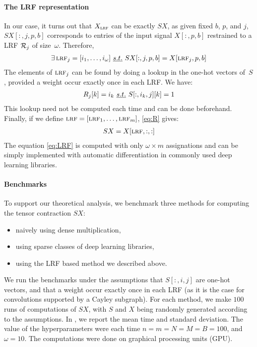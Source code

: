\paragraph{The LRF representation}
In our case, it turns out that $X_{\operatorname{\textsc{lrf}}}$ can be exactly $SX$, as given fixed $b$, $p$, and $j$, $SX[:,j,p,b]$ corresponds to entries of the input signal $X[:,p,b]$ restrained to a LRF $\mathcal{R}_j$ of size~$\omega$. Therefore,
\begin{gather}
\exists \operatorname{\textsc{lrf}}_j = [i_1, \ldots, i_\omega]~\emph{s.t.}~ SX[:,j,p,b] = X[\operatorname{\textsc{lrf}}_j, p, b]
\label{eq:R}
\end{gather}
The elements of $\operatorname{\textsc{lrf}}_j$ can be found by doing a lookup in the one-hot vectors of~$S$, provided a weight occur exactly once in each LRF. We have:
\begin{gather}
R_j[k] = i_k~\emph{s.t.}~ S[:,i_k,j][k] = 1
\end{gather}
This lookup need not be computed each time and can be done beforehand. Finally, if we define $\operatorname{\textsc{lrf}} = [\operatorname{\textsc{lrf}}_1, \ldots, \operatorname{\textsc{lrf}}_m]$, \eqref{eq:R} gives:
\begin{gather}
SX = X[\operatorname{\textsc{lrf}}, :, :]
\label{eq:LRF}
\end{gather}
The equation \eqref{eq:LRF} is computed with only $\omega \times m$ assignations and can be simply implemented with automatic differentiation in commonly used deep learning libraries.

\paragraph{Benchmarks}
To support our theoretical analysis, we benchmark three methods for computing the tensor contraction $SX$:
\begin{itemize}
  \item naively using dense multiplication,
  \item using sparse classes of deep learning libraries,
  \item using the LRF based method we described above.
\end{itemize}

We run the benchmarks under the assumptions that $S[:,i,j]$ are one-hot vectors, and that a weight occur exactly once in each LRF (as it is the case for convolutions supported by a Cayley subgraph). For each method, we make $100$ runs of computations of $SX$, with $S$ and $X$ being randomly generated according to the assumptions. In , we report the mean time and standard deviation. The value of the hyperparameters were each time $n = m = N = M = B = 100$, and $\omega = 10$. The computations were done on graphical processing units (GPU).

